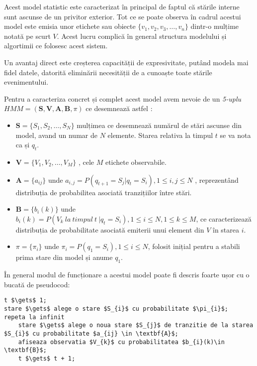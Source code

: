 Acest model statistic este caracterizat în principal de faptul că stările interne sunt ascunse de un privitor exterior. Tot ce se poate observa în cadrul acestui model este emisia unor etichete sau obiecte 
$\{v_{1},v_{2},v_{3},\dots,v_{n}\}$ dintr-o mulțime notată pe scurt $V$. Acest lucru complică în general structura modelului și algortimii ce folosesc acest sistem. \par

Un avantaj direct este creșterea capacității de expresivitate, putând modela mai fidel datele, datorită eliminării necesității de a cunoaște toate stările evenimentului.\par

Pentru a caracteriza concret și complet acest model avem nevoie de un \textit{5-uplu} $ HMM = (\textbf{S},\textbf{V},\textbf{A},\textbf{B},\pi)$ ce desemnează astfel : \par
\begin{itemize}
\item{$\textbf{S} = \{S_{1},S_{2},\dots,S_{N}\}$ mulțimea ce desemnează numărul de stări ascunse din model, avand un numar de $N$ elemente. Starea relativa la timpul $t$ se va nota ca și $q_{t}$.}
\item{$\textbf{V} = \{V_{1},V_{2},\dots,V_{M}\}$ , cele $M$ etichete observabile.}
\item{$\textbf{A} = \{a_{ij}\}$ unde $a_{i,j} = P(q_{t+1} = S_{j} | q_{t} = S_{i}) , 1 \leq i , j \leq N$ , reprezentând distribuția de probabilitea asociată tranzițiilor între stări.}
\item{$\textbf{B} = \{b_{i}(k)\}$ unde $b_{i}(k) = P(V_{k}\ la\ timpul\ t\ | q_{t} = S_{i}), 1 \leq i \leq N , 1 \leq k \leq M$, ce caracterizează distribuția de probabilitate asociată emiterii unui element din $V$ în starea $i$.}
\item{$\pi = \{\pi_{i}\}$ unde $\pi_{i} = P(q_{1} = S_{i}) , 1 \leq i \leq N$, folosit inițial pentru a stabili prima stare din model și anume $q_{1}$.}
\end{itemize}
\par

În general modul de funcționare a acestui model poate fi descris foarte ușor cu o bucată de pseudocod:

\begin{lstlisting}[mathescape=true , caption=Pseudocod ce descrie modul de operare a unui $HMM$]
t $\gets$ 1;
stare $\gets$ alege o stare $S_{i}$ cu probabilitate $\pi_{i}$;
repeta la infinit
	stare $\gets$ alege o noua stare $S_{j}$ de tranzitie de la starea $S_{i}$ cu probabilitate $a_{ij} \in \textbf{A}$;
	afiseaza observatia $V_{k}$ cu probabilitatea $b_{i}(k)\in \textbf{B}$;
	t $\gets$ t + 1;
\end{lstlisting}

